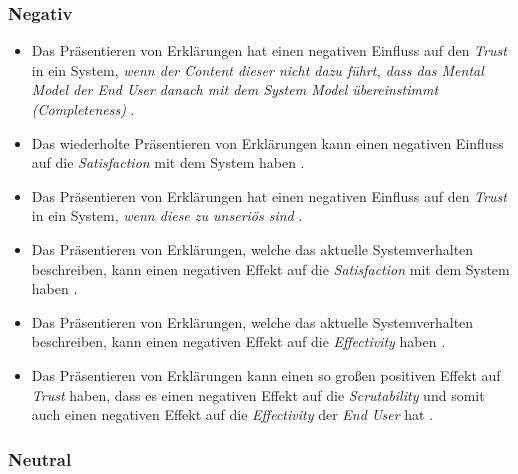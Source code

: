 

\subsubsection*{Negativ}

\begin{itemize}
    \item Das Präsentieren von Erklärungen hat einen negativen Einfluss auf den \textit{Trust} in ein System, \textit{wenn der Content dieser nicht dazu führt, dass das Mental Model der End User danach mit dem System Model übereinstimmt (Completeness)} \cite{schrills_color_2020, chazette_end-users_nodate}.
    \item Das wiederholte Präsentieren von Erklärungen kann einen negativen Einfluss auf die \textit{Satisfaction} mit dem System haben \cite{???}.
    \item Das Präsentieren von Erklärungen hat einen negativen Einfluss auf den \textit{Trust} in ein System, \textit{wenn diese zu unseriös sind} \cite{wang_is_2018}.
    \item Das Präsentieren von Erklärungen, welche das aktuelle Systemverhalten beschreiben, kann einen negativen Effekt auf die \textit{Satisfaction} mit dem System haben \cite{koo_why_2015}.
    \item Das Präsentieren von Erklärungen, welche das aktuelle Systemverhalten beschreiben, kann einen negativen Effekt auf die \textit{Effectivity}  haben \cite{koo_why_2015}.
    \item Das Präsentieren von Erklärungen kann einen so großen positiven Effekt auf \textit{Trust} haben, dass es einen negativen Effekt auf die \textit{Scrutability} und somit auch einen negativen Effekt auf die \textit{Effectivity} der \textit{End User} hat \cite{kohl_explainability_2019}.
\end{itemize}

\subsubsection*{Neutral}

